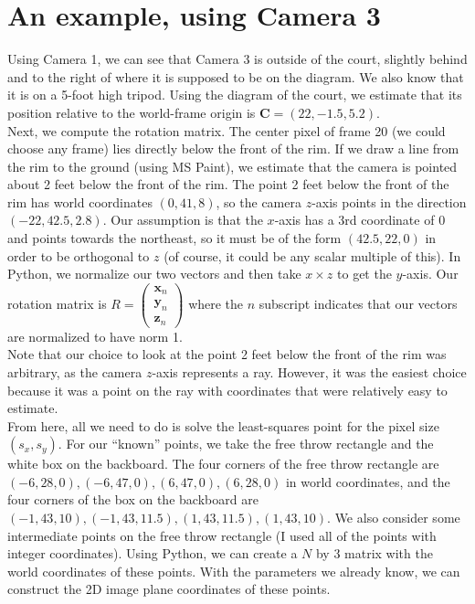 \documentclass{article}
\renewcommand{\vec}[1]{\mathbf{#1}}
\begin{document}
\section{An example, using Camera 3}
Using Camera 1, we can see that Camera 3 is outside of the court, slightly behind and to the right of where it is supposed to be on the diagram. We also know that it is on a 5-foot high tripod. Using the diagram of the court, we estimate that its position relative to the world-frame origin is $\bm{C}=(22, -1.5, 5.2)$. \\

Next, we compute the rotation matrix. The center pixel of frame 20 (we could choose any frame) lies directly below the front of the rim. If we draw a line from the rim to the ground (using MS Paint), we estimate that the camera is pointed about 2 feet below the front of the rim. The point 2 feet below the front of the rim has world coordinates $(0, 41, 8)$, so the camera $z$-axis points in the direction $(-22, 42.5, 2.8)$. Our assumption is that the $x$-axis has a 3rd coordinate of 0 and points towards the northeast, so it must be of the form $(42.5, 22, 0)$ in order to be orthogonal to $z$ (of course, it could be any scalar multiple of this). In Python, we normalize our two vectors and then take $x\times z$ to get the $y$-axis. Our rotation matrix is $R=\begin{pmatrix} \vec{x}_n \\ \vec{y}_n \\ \vec{z}_n \end{pmatrix}$ where the $n$ subscript indicates that our vectors are normalized to have norm 1. \\

Note that our choice to look at the point 2 feet below the front of the rim was arbitrary, as the camera $z$-axis represents a ray. However, it was the easiest choice because it was a point on the ray with coordinates that were relatively easy to estimate. \\

From here, all we need to do is solve the least-squares point for the pixel size $(s_x, s_y)$. For our ``known'' points, we take the free throw rectangle and the white box on the backboard. The four corners of the free throw rectangle are $(-6, 28, 0), (-6, 47, 0), (6, 47, 0), (6, 28, 0)$ in world coordinates, and the four corners of the box on the backboard are $(-1, 43, 10), (-1, 43, 11.5), (1, 43, 11.5), (1, 43, 10)$. We also consider some intermediate points on the free throw rectangle (I used all of the points with integer coordinates). Using Python, we can create a $N$ by 3 matrix with the world coordinates of these points. With the parameters we already know, we can construct the 2D image plane coordinates of these points. \\
\end{document}
